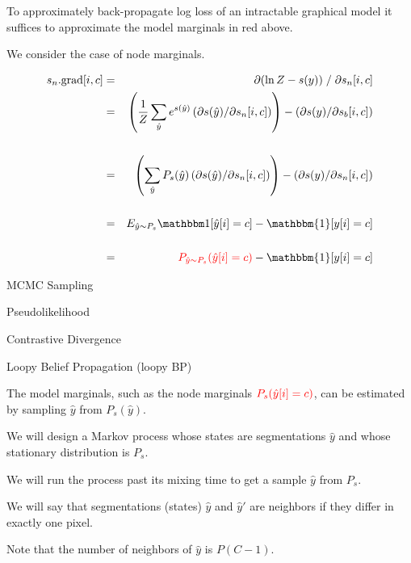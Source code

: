 {\vfill
To approximately back-propagate log loss of an intractable graphical model it suffices to approximate
{\color{red} the model marginals} in red above.


We consider the case of node marginals.

{\huge \begin{eqnarray*}
    s_n.\mathrm{grad}[i,c] & = & \partial (\ln Z - s(y))\;/\;\partial s_n[i,c] \\
    & = & \left(\frac{1}{Z} \sum_{\hat{y}} e^{s(\hat{y})} \left(\partial s(\hat{y})/\partial s_n[i,c]\right)\right)
    - \left(\partial s(y) /\partial s_b[i,c]\right)    \\
    \\
    & = & \left(\sum_{\hat{y}} P_s(\hat{y}) \left(\partial s(\hat{y})/\partial s_n[i,c]\right)\right)
    - \left(\partial s(y) /\partial s_n[i,c]\right)    \\
    \\
    & = & E_{\hat{y} \sim P_s}\bbone[\hat{y}[i] = c]
    - \mathbbm{1}[y[i] = c] \\
    \\
    & = & {\color{red} P_{\hat{y} \sim P_s}(\hat{y}[i] = c)}
      - \mathbbm{1}[y[i] = c]
\end{eqnarray*}
}


MCMC Sampling

\vfill
Pseudolikelihood

\vfill
Contrastive Divergence

\vfill
Loopy Belief Propagation (loopy BP)

The model marginals, such as the node marginals
 ${\color{red} P_s(\hat{y}[i]=c)}$, can be estimated by sampling $\hat{y}$ from $P_s(\hat{y})$.

\vfill
We will design a Markov process whose states are segmentations $\hat{y}$ and whose stationary distribution is $P_s$.

\vfill
We will run the process past its mixing time to get a sample $\hat{y}$ from $P_s$.


We will say that segmentations (states) $\hat{y}$ and $\hat{y}'$ are neighbors if they differ in exactly one pixel.

\vfill
Note that the number of neighbors of $\hat{y}$ is $P(C-1)$.

}
